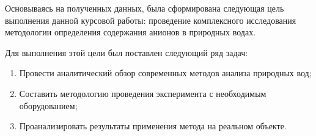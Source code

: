 Основываясь на полученных данных, была сформирована следующая цель выполнения данной курсовой работы: проведение комплексного исследования методологии определения содержания анионов в природных водах.

Для выполнения этой цели был поставлен следующий ряд задач:
\begin{enumerate}[label=\arabic*., leftmargin=\parindent, nosep]
	\item Провести аналитический обзор современных методов анализа природных вод;
	\item Составить методологию проведения эксперимента с необходимым оборудованием;
	\item Проанализировать результаты применения метода на реальном объекте.
\end{enumerate}
